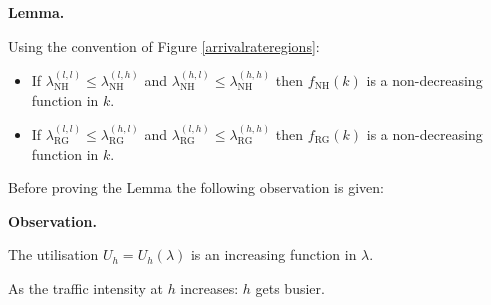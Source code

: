 \documentclass{article}
\newcommand{\NH}{\text{NH}}
\newcommand{\RG}{\text{RG}}
\begin{document}
\textbf{Lemma.}

Using the convention of Figure \ref{arrivalrateregions}:

\begin{itemize}

\item If $\lambda_{\NH}^{(l,l)}\leq \lambda_{\NH}^{(l,h)}$ and $\lambda_{\NH}^{(h,l)}\leq \lambda_{\NH}^{(h,h)}$ then $f_{\NH}(k)$ is a non-decreasing function in $k$.
\item If $\lambda_{\RG}^{(l,l)}\leq \lambda_{\RG}^{(h,l)}$ and $\lambda_{\RG}^{(l,h)}\leq \lambda_{\RG}^{(h,h)}$ then $f_{\RG}(k)$ is a non-decreasing function in $k$.

\end{itemize}

Before proving the Lemma the following observation is given:

\textbf{Observation.}

The utilisation $U_h=U_h(\lambda)$ is an increasing function in $\lambda$.

\begin{center}
As the traffic intensity at $h$ increases: $h$ gets busier.
\end{center}
\end{document}
